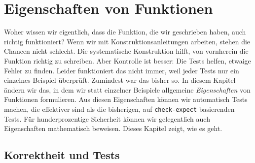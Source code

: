 
\chapter{Eigenschaften von Funktionen}
\label{cha:properties}

Woher wissen wir eigentlich, dass die Funktion, die wir geschrieben
haben, auch richtig funktioniert?  Wenn wir mit
Konstruktionsanleitungen arbeiten, stehen die Chancen nicht schlecht.
Die systematische Konstruktion hilft, von vornherein die Funktion
richtig zu schreiben.  Aber Kontrolle ist besser: Die Tests helfen,
etwaige Fehler zu finden.  Leider funktioniert das nicht immer, weil
jeder Tests nur ein einzelnes Beispiel überprüft.  Zumindest war das
bisher so.  In diesem Kapitel ändern wir das, in dem wir statt
einzelner Beispiele allgemeine \textit{Eigenschaften} von Funktionen
formulieren.  Aus diesen Eigenschaften können wir automatisch Tests
machen, die effektiver sind als die bisherigen, auf
\lstinline{check-expect} basierenden Tests.  Für hunderprozentige
Sicherheit können wir gelegentlich auch Eigenschaften mathematisch
beweisen.  Dieses Kapitel zeigt, wie es geht.

\section{Korrektheit und Tests}

